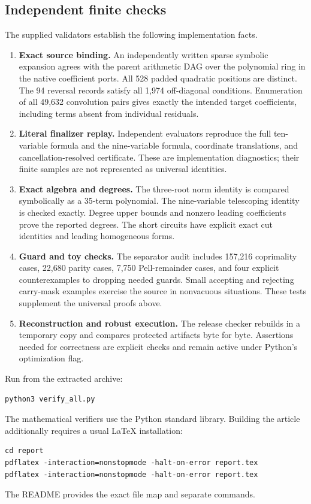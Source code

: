 \documentclass[11pt,letterpaper]{article}
\theoremstyle{remark}\newtheorem{remark}[theorem]{Remark}
\begin{document}
\subsection{Independent finite checks}
The supplied validators establish the following implementation facts.
\begin{enumerate}
\item \textbf{Exact source binding.}
An independently written sparse symbolic expansion agrees with the
parent arithmetic DAG over the polynomial ring in the native coefficient
ports. All 528 padded quadratic positions are distinct.
The 94 reversal records satisfy all 1,974 off-diagonal conditions.
Enumeration of all 49,632 convolution pairs gives exactly the intended
target coefficients, including terms absent from individual residuals.

\item \textbf{Literal finalizer replay.}
Independent evaluators reproduce the full ten-variable formula and the
nine-variable formula, coordinate translations, and cancellation-resolved
certificate. These are implementation diagnostics; their finite samples
are not represented as universal identities.

\item \textbf{Exact algebra and degrees.}
The three-root norm identity is compared symbolically as a 35-term
polynomial. The nine-variable telescoping identity is checked exactly.
Degree upper bounds and nonzero leading coefficients prove the reported
degrees. The short circuits have explicit exact cut identities and
leading homogeneous forms.

\item \textbf{Guard and toy checks.}
The separator audit includes 157,216 coprimality cases, 22,680 parity
cases, 7,750 Pell-remainder cases, and four explicit counterexamples to
dropping needed guards. Small accepting and rejecting carry-mask examples
exercise the source in nonvacuous situations. These tests supplement
the universal proofs above.

\item \textbf{Reconstruction and robust execution.}
The release checker rebuilds in a temporary copy and compares protected
artifacts byte for byte. Assertions needed for correctness are explicit
checks and remain active under Python's optimization flag.
\end{enumerate}

Run from the extracted archive:
\begin{verbatim}
python3 verify_all.py
\end{verbatim}
The mathematical verifiers use the Python standard library.
Building the article additionally requires a usual LaTeX installation:
\begin{verbatim}
cd report
pdflatex -interaction=nonstopmode -halt-on-error report.tex
pdflatex -interaction=nonstopmode -halt-on-error report.tex
\end{verbatim}
The README provides the exact file map and separate commands.
\end{document}
